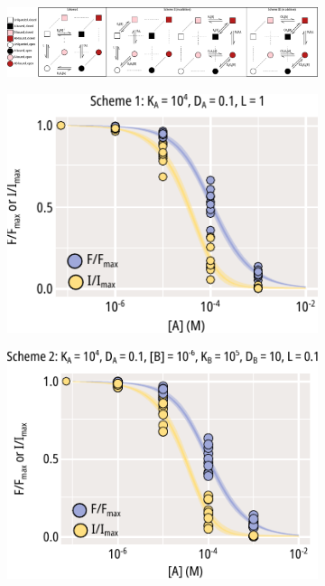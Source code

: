 \begin{figure}[h]
	\centering
	\begin{subfigure}[t]{0.9\textwidth}
		\caption{}\label{chxfig:mwc_model_diagrams}
		\centering
		\includegraphics[width=\textwidth]{mwc_model_diagrams.pdf}
	\end{subfigure}
	\vfill
	\begin{subfigure}[t]{0.3\textwidth}
		\caption{}\label{chxfig:mwc_scheme_1_fits}
		\centering
		\includegraphics[width=\textwidth]{mwc_scheme_1_fits.pdf}
	\end{subfigure}
	\hfill
	\begin{subfigure}[t]{0.3\textwidth}
		\caption{}\label{chxfig:mwc_scheme_2_fits}
		\centering
		\includegraphics[width=\textwidth]{mwc_scheme_2_fits.pdf}

\end{subfigure}
\end{figure}
